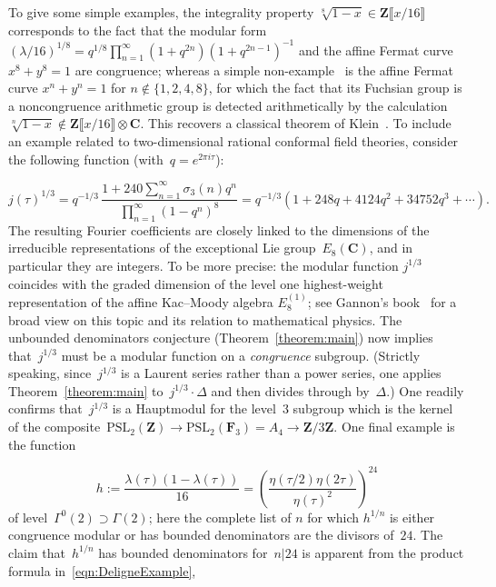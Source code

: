 \documentclass[10pt]{amsart}
\def\PSL{\mathrm{PSL}}
\def\SSS{\S}
\def\F{\mathbf{F}}
\def\Z{\mathbf{Z}}
\theoremstyle{remark}
\numberwithin{equation}{subsection}
\def\numequation{\addtocounter{subsubsection}{1}\begin{equation}}
\def\C{\mathbf{C}}
\begin{document}
To give some simple examples, the integrality property $\sqrt[8]{1-x} \in \Z\llbracket x/16 \rrbracket$ corresponds to the fact that the modular form $(\lambda/16)^{1/8} = q^{1/8} \prod_{n=1}^{\infty} (1 + q^{2n})(1 + q^{2n-1})^{-1}$ and the affine Fermat curve $x^8 + y^8 = 1$ are  congruence; whereas a simple non-example~\cite[\SSS~5.5]{Long} is the affine Fermat curve $x^n + y^n = 1$ for $n \notin \{1, 2, 4, 8\}$, for which the fact that its Fuchsian group is a noncongruence arithmetic group is detected arithmetically by the calculation $\sqrt[n]{1-x} \notin \Z\llbracket x/16 \rrbracket \otimes \C$.  This recovers a classical theorem of Klein~\cite[page~534]{FrickeKlein}.
To include 
an example related to
two-dimensional rational conformal field theories, consider
the  following function  (with~$q=e^{2 \pi i \tau}$):
\numequation \label{cube root of j}
j(\tau)^{1/3} = q^{-1/3} \, \frac{1 + 240 \sum_{n=1}^{\infty} \sigma_3(n) q^n}{\prod_{n=1}^{\infty} (1-q^n)^8} =  q^{-1/3} (1 + 248q + 4124q^2 + 34752q^3 + \cdots). 
\end{equation}
The resulting Fourier coefficients 
are closely linked to the dimensions of the irreducible representations of the  exceptional
Lie group~$E_8(\C)$, and in particular they are integers. To be more precise: the  modular function $j^{1/3}$ coincides with the graded dimension of the
 level one highest-weight representation
of the affine Kac--Moody algebra $E_8^{(1)}$; see Gannon's book~\cite[\SSS~0.5 and~\SSS~3.2.3]{Gannon} 
for a broad view on this topic and
its relation to mathematical physics.
The unbounded denominators conjecture (Theorem~\ref{theorem:main}) now implies that~$j^{1/3}$ 
must be a modular function on a
\emph{congruence} subgroup.   (Strictly speaking,
since~$j^{1/3}$ is a Laurent series rather than a power series, one applies Theorem~\ref{theorem:main}  to~$j^{1/3} \cdot \Delta$
and then divides through by~$\Delta$.)
One readily confirms that~$j^{1/3}$ is a  Hauptmodul for
the level~$3$ subgroup which is the kernel of the composite~$\PSL_2(\Z) \rightarrow \PSL_2(\F_3) = A_4 \rightarrow \Z/3\Z$.
One final example is the function
\numequation
\label{eqn:DeligneExample}
h:=\frac{\lambda(\tau)(1 - \lambda(\tau))}{16} = \left( \frac{\eta(\tau/2) \eta(2 \tau)}{\eta(\tau)^2} \right)^{24}
\end{equation}
of level~$\Gamma^0(2) \supset \Gamma(2)$; 
 here the complete list of $n$ for which $h^{1/n}$ is either congruence modular or has bounded denominators are the divisors of~$24$. 
 The claim that~$h^{1/n}$ has bounded denominators for~$n|24$ is apparent from the product formula in~\autoref{eqn:DeligneExample},
\end{document}
